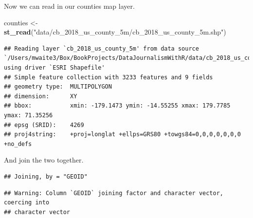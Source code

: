 \documentclass[]{book}
\newenvironment{Shaded}{\begin{snugshade}}{\end{snugshade}}
\newcommand{\DataTypeTok}[1]{\textcolor[rgb]{0.13,0.29,0.53}{#1}}
\newcommand{\DecValTok}[1]{\textcolor[rgb]{0.00,0.00,0.81}{#1}}
\newcommand{\KeywordTok}[1]{\textcolor[rgb]{0.13,0.29,0.53}{\textbf{#1}}}
\newcommand{\NormalTok}[1]{#1}
\newcommand{\OperatorTok}[1]{\textcolor[rgb]{0.81,0.36,0.00}{\textbf{#1}}}
\newcommand{\StringTok}[1]{\textcolor[rgb]{0.31,0.60,0.02}{#1}}
\begin{document}
\begin{Shaded}
\end{Shaded}

Now we can read in our counties map layer.

\begin{Shaded}
\begin{Highlighting}[]
\NormalTok{counties <-}\StringTok{ }\KeywordTok{st_read}\NormalTok{(}\StringTok{"data/cb_2018_us_county_5m/cb_2018_us_county_5m.shp"}\NormalTok{)}
\end{Highlighting}
\end{Shaded}

\begin{verbatim}
## Reading layer `cb_2018_us_county_5m' from data source `/Users/mwaite3/Box/BookProjects/DataJournalismWithR/data/cb_2018_us_county_5m/cb_2018_us_county_5m.shp' using driver `ESRI Shapefile'
## Simple feature collection with 3233 features and 9 fields
## geometry type:  MULTIPOLYGON
## dimension:      XY
## bbox:           xmin: -179.1473 ymin: -14.55255 xmax: 179.7785 ymax: 71.35256
## epsg (SRID):    4269
## proj4string:    +proj=longlat +ellps=GRS80 +towgs84=0,0,0,0,0,0,0 +no_defs
\end{verbatim}

And join the two together.

\begin{Shaded}
\end{Shaded}

\begin{verbatim}
## Joining, by = "GEOID"
\end{verbatim}

\begin{verbatim}
## Warning: Column `GEOID` joining factor and character vector, coercing into
## character vector
\end{verbatim}
\end{document}
